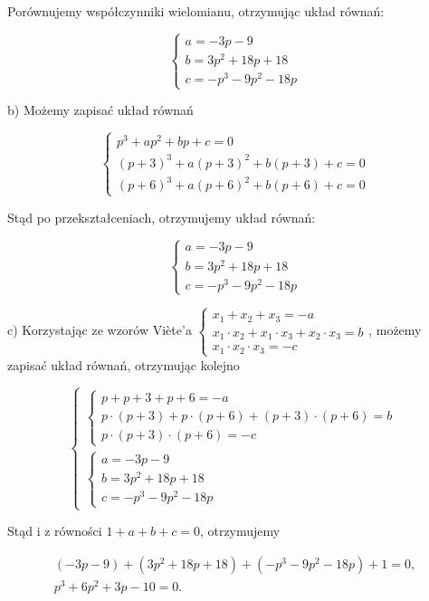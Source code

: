 \documentclass[10pt]{article}
\begin{document}
Porównujemy współczynniki wielomianu, otrzymując układ równań:

$$
\left\{\begin{array}{l}
a=-3 p-9 \\
b=3 p^{2}+18 p+18 \\
c=-p^{3}-9 p^{2}-18 p
\end{array}\right.
$$

b) Możemy zapisać układ równań

$$
\left\{\begin{array}{l}
p^{3}+a p^{2}+b p+c=0 \\
(p+3)^{3}+a(p+3)^{2}+b(p+3)+c=0 \\
(p+6)^{3}+a(p+6)^{2}+b(p+6)+c=0
\end{array}\right.
$$

Stąd po przekształceniach, otrzymujemy układ równań:

$$
\left\{\begin{array}{l}
a=-3 p-9 \\
b=3 p^{2}+18 p+18 \\
c=-p^{3}-9 p^{2}-18 p
\end{array}\right.
$$

c) Korzystając ze wzorów Viète’a $\left\{\begin{array}{l}x_{1}+x_{2}+x_{3}=-a \\ x_{1} \cdot x_{2}+x_{1} \cdot x_{3}+x_{2} \cdot x_{3}=b \\ x_{1} \cdot x_{2} \cdot x_{3}=-c\end{array}\right.$, możemy zapisać układ równań, otrzymując kolejno

$$
\left\{\begin{array}{l}
\left\{\begin{array}{l}
p+p+3+p+6=-a \\
p \cdot(p+3)+p \cdot(p+6)+(p+3) \cdot(p+6)=b \\
p \cdot(p+3) \cdot(p+6)=-c
\end{array}\right. \\
\left\{\begin{array}{l}
a=-3 p-9 \\
b=3 p^{2}+18 p+18 \\
c=-p^{3}-9 p^{2}-18 p
\end{array}\right.
\end{array}\right.
$$

Stąd i z równości $1+a+b+c=0$, otrzymujemy

$$
\begin{gathered}
(-3 p-9)+\left(3 p^{2}+18 p+18\right)+\left(-p^{3}-9 p^{2}-18 p\right)+1=0, \\
p^{3}+6 p^{2}+3 p-10=0 .
\end{gathered}
$$
\end{document}
